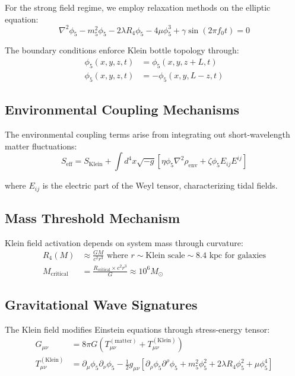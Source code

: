 \documentclass[12pt]{iopart}
\begin{document}
For the strong field regime, we employ relaxation methods on the elliptic equation:
\begin{equation}
\nabla^2\phi_5 - m_5^2\phi_5 - 2\lambda R_4\phi_5 - 4\mu\phi_5^3 + \gamma\sin(2\pi f_0 t) = 0
\end{equation}

The boundary conditions enforce Klein bottle topology through:
\begin{align}
\phi_5(x,y,z,t) &= \phi_5(x,y,z+L,t)\\
\phi_5(x,y,z,t) &= -\phi_5(x,y,L-z,t)
\end{align}

\subsection{Environmental Coupling Mechanisms}

The environmental coupling terms arise from integrating out short-wavelength matter fluctuations:
\begin{equation}
S_{\text{eff}} = S_{\text{Klein}} + \int d^4x \sqrt{-g}\left[\eta\phi_5\nabla^2\rho_{\text{env}} + \zeta\phi_5 E_{ij}E^{ij}\right]
\end{equation}

where $E_{ij}$ is the electric part of the Weyl tensor, characterizing tidal fields.

\subsection{Mass Threshold Mechanism}

Klein field activation depends on system mass through curvature:
\begin{align}
R_4(M) &\approx \frac{GM}{c^2r^3} \text{ where } r \sim \text{Klein scale} \sim 8.4 \text{ kpc for galaxies}\\
M_{\text{critical}} &= \frac{R_{\text{critical}} \times c^2r^3}{G} \approx 10^6 M_\odot
\end{align}

\subsection{Gravitational Wave Signatures}

The Klein field modifies Einstein equations through stress-energy tensor:
\begin{align}
G_{\mu\nu} &= 8\pi G(T_{\mu\nu}^{(\text{matter})} + T_{\mu\nu}^{(\text{Klein})})\\
T_{\mu\nu}^{(\text{Klein})} &= \partial_\mu\phi_5 \partial_\nu\phi_5 - \frac{1}{2}g_{\mu\nu}[\partial_\rho\phi_5 \partial^\rho\phi_5 + m_5^2\phi_5^2 + 2\lambda R_4\phi_5^2 + \mu\phi_5^4]
\end{align}
\end{document}
